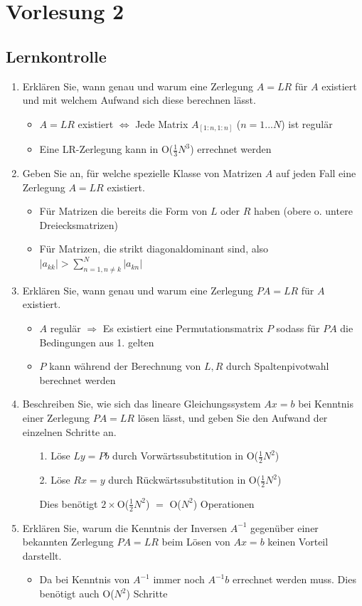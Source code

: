 \documentclass[]{article}
\begin{document}
\section{Vorlesung 2}
\subsection{Lernkontrolle}
	\begin{enumerate}
		\item Erklären Sie, wann genau und warum eine Zerlegung $A=LR$ für $A$ existiert und mit welchem Aufwand sich diese berechnen lässt.
			\begin{itemize}
				\item $A = LR$ existiert $\Leftrightarrow$ Jede Matrix $A_{[1:n,1:n]}$ ($n = 1...N$) ist regulär
				\item Eine LR-Zerlegung kann in O($\frac{1}{3} N^3$) errechnet werden
			\end{itemize}
		\item Geben Sie an, für welche spezielle Klasse von Matrizen $A$ auf jeden Fall eine Zerlegung $A=LR$ existiert.
			\begin{itemize}
				\item Für Matrizen die bereits die Form von $L$ oder $R$ haben (obere o. untere Dreiecksmatrizen)
                \item Für Matrizen, die strikt diagonaldominant sind, also $|a_{kk}| > \sum_{n=1, n \neq k}^{N} |a_{kn}|$
			\end{itemize}
		\item Erklären Sie, wann genau und warum eine Zerlegung $PA=LR$ für $A$ existiert.
			\begin{itemize}
				\item $A$ regulär $\Rightarrow$ Es existiert eine Permutationsmatrix $P$ sodass für $PA$ die Bedingungen aus 1. gelten
				\item $P$ kann während der Berechnung von $L, R$ durch Spaltenpivotwahl berechnet werden
			\end{itemize}
		\item Beschreiben Sie, wie sich das lineare Gleichungssystem $Ax=b$ bei Kenntnis einer Zerlegung $PA=LR$ lösen lässt, und geben Sie den Aufwand der einzelnen Schritte an.
			\begin{enumerate}
				\item[1.] Löse $Ly = Pb$ durch Vorwärtssubstitution in O($\frac{1}{2} N^2$)
				\item[2.] Löse $Rx = y$ durch Rückwärtssubstitution in O($\frac{1}{2} N^2$)
				\item[  ] Dies benötigt $2 \times$O($\frac{1}{2} N^2$) $=$ O($N^2$) Operationen
			\end{enumerate}
		\item Erklären Sie, warum die Kenntnis der Inversen $A^{-1}$ gegenüber einer bekannten Zerlegung $PA = LR$ beim Lösen von $Ax = b$ keinen Vorteil darstellt.
			\begin{itemize}
				\item Da bei Kenntnis von $A^{-1}$ immer noch $A^{-1} b$ errechnet werden muss. Dies benötigt auch O($N^2$) Schritte
			\end{itemize}
	\end{enumerate}
\end{document}
